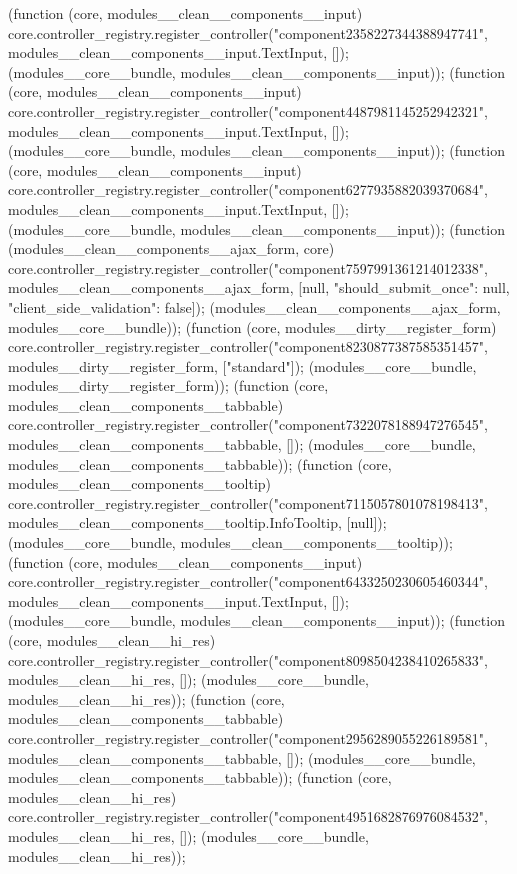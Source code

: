 {{(function (core, modules__clean__components__input) { core.controller_registry.register_controller("component2358227344388947741", modules__clean__components__input.TextInput, []); }(modules__core__bundle, modules__clean__components__input));
(function (core, modules__clean__components__input) { core.controller_registry.register_controller("component4487981145252942321", modules__clean__components__input.TextInput, []); }(modules__core__bundle, modules__clean__components__input));
(function (core, modules__clean__components__input) { core.controller_registry.register_controller("component6277935882039370684", modules__clean__components__input.TextInput, []); }(modules__core__bundle, modules__clean__components__input));
(function (modules__clean__components__ajax_form, core) { core.controller_registry.register_controller("component7597991361214012338", modules__clean__components__ajax_form, [null, {"should_submit_once": null, "client_side_validation": false}]); }(modules__clean__components__ajax_form, modules__core__bundle));
(function (core, modules__dirty__register_form) { core.controller_registry.register_controller("component8230877387585351457", modules__dirty__register_form, ["standard"]); }(modules__core__bundle, modules__dirty__register_form));
(function (core, modules__clean__components__tabbable) { core.controller_registry.register_controller("component7322078188947276545", modules__clean__components__tabbable, []); }(modules__core__bundle, modules__clean__components__tabbable));
(function (core, modules__clean__components__tooltip) { core.controller_registry.register_controller("component7115057801078198413", modules__clean__components__tooltip.InfoTooltip, [null]); }(modules__core__bundle, modules__clean__components__tooltip));
(function (core, modules__clean__components__input) { core.controller_registry.register_controller("component6433250230605460344", modules__clean__components__input.TextInput, []); }(modules__core__bundle, modules__clean__components__input));
(function (core, modules__clean__hi_res) { core.controller_registry.register_controller("component8098504238410265833", modules__clean__hi_res, []); }(modules__core__bundle, modules__clean__hi_res));
(function (core, modules__clean__components__tabbable) { core.controller_registry.register_controller("component2956289055226189581", modules__clean__components__tabbable, []); }(modules__core__bundle, modules__clean__components__tabbable));
(function (core, modules__clean__hi_res) { core.controller_registry.register_controller("component4951682876976084532", modules__clean__hi_res, []); }(modules__core__bundle, modules__clean__hi_res));
}}
